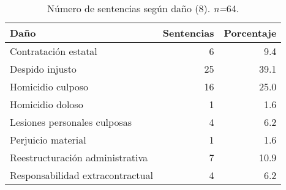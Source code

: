 \begin{table}[!htbp]
\centering
\caption{Número de sentencias según daño (8). \textit{n=}64.} 
\label{tab:dano}
\begin{tabular}{lrr}
  \hline
Daño & Sentencias & Porcentaje \\ 
  \hline
Contratación estatal &  6 & 9.4 \\ 
  Despido injusto & 25 & 39.1 \\ 
  Homicidio culposo & 16 & 25.0 \\ 
  Homicidio doloso &  1 & 1.6 \\ 
  Lesiones personales culposas &  4 & 6.2 \\ 
  Perjuicio material &  1 & 1.6 \\ 
  Reestructuración administrativa &  7 & 10.9 \\ 
  Responsabilidad extracontractual &  4 & 6.2 \\ 
   \hline
\end{tabular}
\end{table}
